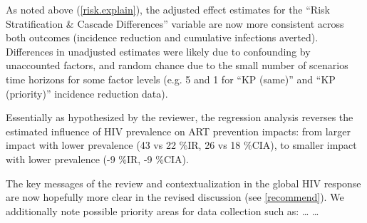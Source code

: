 \begin{response}
As noted above (\ref{risk.explain}), the adjusted effect estimates for
the ``Risk Stratification \& Cascade Differences'' variable are now more consistent across both outcomes
(incidence reduction and cumulative infections averted).
Differences in unadjusted estimates were likely due to confounding by unaccounted factors,
and random chance due to the small number of scenarios time horizons for some factor levels
(e.g. 5 and 1 for ``KP (same)'' and ``KP (priority)'' incidence reduction data).
\end{response}
\begin{comment}
As HIV prevalence is linked to epidemic type, it's interesting that ART prevention impacts were larger with lower HIV prevalence. As the lower prevalence epidemics in West Africa are driven by KPs/more so than the epidemics in ESA, I assume that modelling studies in West Africa are more likely to be KP-disaggregated. However, you have shown that KP-disaggregated models estimate smaller ART prevention impacts. Could this be explored further?
\end{comment}
\begin{response}
Essentially as hypothesized by the reviewer,
the regression analysis reverses the estimated influence of HIV prevalence on ART prevention impacts:
from larger impact with lower prevalence (43 vs 22 \%IR, 26 vs 18 \%CIA),
to smaller impact with lower prevalence (-9 \%IR, -9 \%CIA).
\end{response}
\begin{comment}
Whilst recognising this is a scoping review, some more discussion on the impact of these findings for the global HIV response would be welcome. As noted in the discussion, modelled estimates "did not always reflect the available data". The key population estimates (and subsequent estimates of averted HIV transmission) are reliant on weak data and some informed comment on how these results should be used would be good.
\end{comment}
\begin{response}
The key messages of the review and contextualization in the global HIV response
are now hopefully more clear in the revised discussion (see \ref{recommend}).
We additionally note possible priority areas for data collection such as:
 \dots
{} \dots
{}
\end{response}
